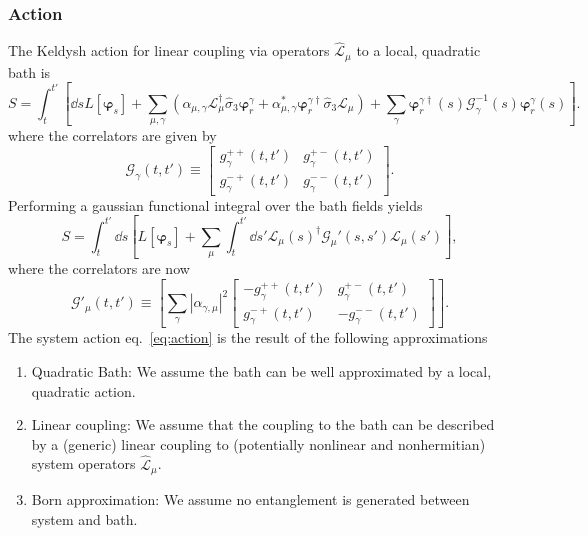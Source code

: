 \documentclass{article}
\let\vec\bm
\begin{document}
\subsubsection{Action}
The Keldysh action for linear coupling via operators $\hat{\mathcal{L}}_\mu$ to a local, quadratic bath is
    \begin{equation}
        S = \int_t^{t'}\left[ \dd{s} L[\vec{\varphi}_s] +  \sum_{\mu, \gamma} \left(\alpha_{\mu, \gamma}\vec{\mathcal{L}}^\dagger_\mu \hat{\sigma}_3 \vec{\varphi}_r^\gamma + \alpha_{\mu, \gamma}^* \vec{\varphi}^{\gamma\dagger}_r \hat{\sigma}_3 \vec{\mathcal{L}}_\mu \right) + \sum_\gamma \vec{\varphi}^{\gamma\dagger}_r(s) \mathcal{G}_{\gamma}^{-1}(s) \vec{\varphi}_r^\gamma(s)\right].
    \end{equation}
where the correlators are given by
\begin{equation}
    \mathcal{G}_{\gamma}(t, t') 
    \equiv 
    \begin{bmatrix}
        g_{\gamma}^{++}(t, t') & g_{\gamma}^{+-}(t, t') \\
        g_{\gamma}^{-+}(t, t') & g_{\gamma}^{--}(t, t') 
    \end{bmatrix}.
\end{equation}
Performing a gaussian functional integral over the bath fields yields
\begin{equation}
    S = \int_t^{t'} \dd{s}\left[L[\vec{\varphi}_s] +  \sum_\mu \int_t^{t'}\dd{s'} \vec{\mathcal{L}}_\mu(s)^\dagger \mathcal{G}_\mu'(s, s') \vec{\mathcal{L}}_\mu(s')\right],\nonumber\label{eq:action}
\end{equation}
where the correlators are now
\begin{equation}
    \mathcal{G}'_\mu(t, t') \equiv \left[\sum_{\gamma}|\alpha_{\gamma, \mu}|^2 \begin{bmatrix} -g_\gamma^{++}(t, t') & g_\gamma^{+-}(t, t') \\ g_\gamma^{-+}(t, t') & -g_\gamma^{--}(t, t')\end{bmatrix} \right].
\end{equation}
The system action eq.~\ref{eq:action} is the result of the following approximations
\begin{enumerate}
        \item Quadratic Bath: We assume the bath can be well approximated by a local, quadratic action.
        \item Linear coupling: We assume that the coupling to the bath can be described by a (generic) linear coupling to (potentially nonlinear and nonhermitian) system operators $\hat{\mathcal{L}}_\mu$.
        \item Born approximation: We assume no entanglement is generated between system and bath.
\end{enumerate}
\end{document}
